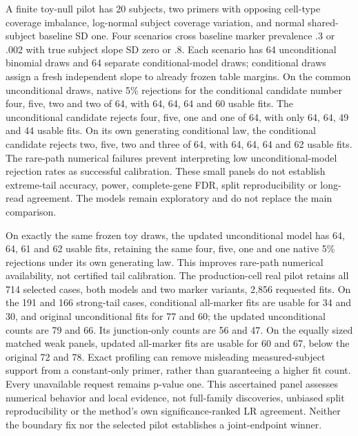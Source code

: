 \documentclass[11pt]{article}
\begin{document}
A finite toy-null pilot has 20 subjects, two primers with opposing cell-type coverage imbalance, log-normal subject coverage variation, and normal shared-subject baseline SD one. Four scenarios cross baseline marker prevalence .3 or .002 with true subject slope SD zero or .8. Each scenario has 64 unconditional binomial draws and 64 separate conditional-model draws; conditional draws assign a fresh independent slope to already frozen table margins. On the common unconditional draws, native 5\% rejections for the conditional candidate number four, five, two and two of 64, with 64, 64, 64 and 60 usable fits. The unconditional candidate rejects four, five, one and one of 64, with only 64, 64, 49 and 44 usable fits. On its own generating conditional law, the conditional candidate rejects two, five, two and three of 64, with 64, 64, 64 and 62 usable fits. The rare-path numerical failures prevent interpreting low unconditional-model rejection rates as successful calibration. These small panels do not establish extreme-tail accuracy, power, complete-gene FDR, split reproducibility or long-read agreement. The models remain exploratory and do not replace the main comparison.

On exactly the same frozen toy draws, the updated unconditional model has 64, 64, 61 and 62 usable fits, retaining the same four, five, one and one native 5\% rejections under its own generating law. This improves rare-path numerical availability, not certified tail calibration. The production-cell real pilot retains all 714 selected cases, both models and two marker variants, 2,856 requested fits. On the 191 and 166 strong-tail cases, conditional all-marker fits are usable for 34 and 30, and original unconditional fits for 77 and 60; the updated unconditional counts are 79 and 66. Its junction-only counts are 56 and 47. On the equally sized matched weak panels, updated all-marker fits are usable for 60 and 67, below the original 72 and 78. Exact profiling can remove misleading measured-subject support from a constant-only primer, rather than guaranteeing a higher fit count. Every unavailable request remains p-value one. This ascertained panel assesses numerical behavior and local evidence, not full-family discoveries, unbiased split reproducibility or the method's own significance-ranked LR agreement. Neither the boundary fix nor the selected pilot establishes a joint-endpoint winner.
\end{document}
